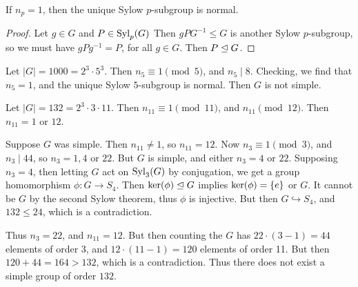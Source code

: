 \documentclass[a4paper]{scrartcl}
\begin{document}
\begin{corollary}
	If $n_p = 1$, then the unique Sylow $p$-subgroup is normal.
\end{corollary}
\begin{proof}
Let $g \in G$ and $P \in \operatorname{Syl}_p(G)$ Then $gPG^{-1} \leq G$ is another Sylow $p$-subgroup, so we must have $gPg^{-1} = P$, for all $g \in G$. Then $P \trianglelefteq G$.
\end{proof}

\begin{example}
Let $|G| = 1000 = 2^3 \cdot 5^3$. Then $n_5 \equiv 1 \pmod{5}$, and $n_5 \mid 8$. Checking, we find that $n_5 = 1$, and the unique Sylow $5$-subgroup is normal. Then $G$ is not simple.
\end{example}


\begin{example}
	Let $|G| = 132 = 2^3 \cdot 3 \cdot 11$. Then $n_{11} \equiv 1 \pmod{11}$, and $n_{11} \pmod 12$. Then $n_{11} = 1$ or $12$. 

	Suppose $G$ was simple. Then $n_{11} \neq 1$, so $n_{11} = 12$. Now $n_3 \equiv 1 \pmod{3}$, and $n_3 \mid 44$, so $n_3 = 1, 4$ or $22$. But $G$ is simple, and either $n_3 = 4$ or $22$. Supposing $n_3 = 4$, then letting $G$ act on $\operatorname{Syl}_3(G)$ by conjugation, we get a group homomorphism $\phi: G \rightarrow S_4$. Then $\operatorname{ker}(\phi) \trianglelefteq G$ implies $\operatorname{ker}(\phi) = \{e\}$ or $G$. It cannot be $G$ by the second Sylow theorem, thus $\phi$ is injective. But then $G \hookrightarrow S_4$, and $132 \leq 24$, which is a contradiction.

	Thus $n_3 = 22$, and $n_11 = 12$. But then counting the $G$ has $22 \cdot (3 - 1) = 44$ elements of order 3, and $12 \cdot (11 - 1) = 120$ elements of order 11. But then $120 + 44 = 164 > 132$, which is a contradiction. Thus there does not exist a simple group of order $132$. 
\end{example}
\end{document}
